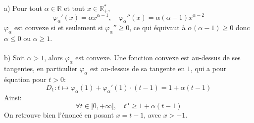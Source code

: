 a) Pour tout $\alpha \in \mathbb{R}$ et tout $x \in \mathbb{R}^*_+$, 
\[
\varphi_{\alpha}'(x)=\alpha x^{\alpha-1}, \quad \varphi_{\alpha}''(x)=\alpha(\alpha-1)x^{\alpha-2}
\] 
$\varphi_{\alpha}$ est convexe si et seulement si $\varphi_{\alpha}''\geq 0$, ce qui équivaut \`a $\alpha(\alpha-1)\geq 0$ donc $\alpha\leq 0$ ou $\alpha \geq 1$.\\ \\
b) Soit $\alpha > 1$, alors $\varphi_{\alpha}$ est convexe. Une fonction convexe est au-dessus de ses tangentes, en particulier $\varphi_{\alpha}$ est au-dessus de sa tangente en $1$, qui a pour équation pour $t>0$:
\[
D_1:t\mapsto \varphi_{\alpha}(1)+\varphi_{\alpha}'(1)\cdot (t-1) = 1+\alpha(t-1)
\]
Ainsi: 
\[
\forall t\in ]0,+\infty[, \quad t^\alpha \geq 1 + \alpha(t-1)
\]
On retrouve bien l’énoncé en posant $x=t-1$, avec $x>-1$.
